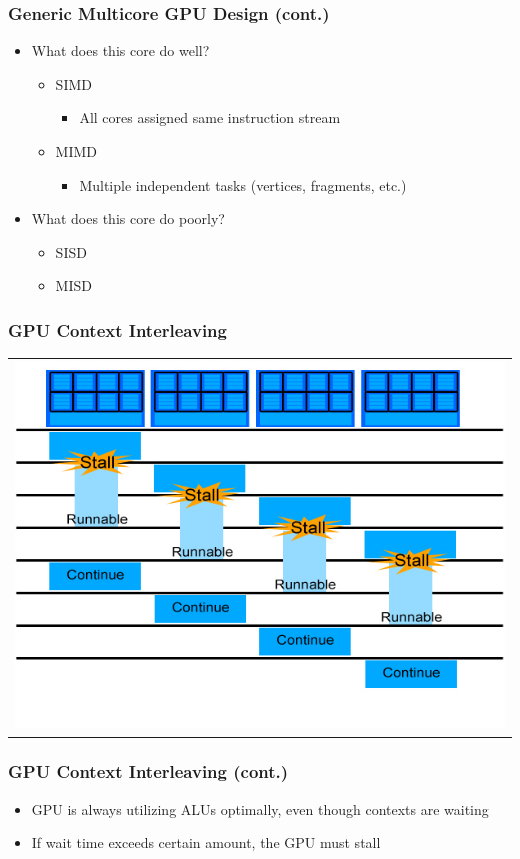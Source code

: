 \documentclass{beamer}
\begin{document}
\begin{frame}
	\frametitle{Generic Multicore GPU Design (cont.)}
	\begin{itemize}
		\item<1-> What does this core do well?
		\begin{itemize}
			\item<2-> SIMD
			\begin{itemize}
				\item<2-> All cores assigned same instruction stream
			\end{itemize}
			\item<3-> MIMD
			\begin{itemize}
				\item<3-> Multiple independent tasks (vertices, fragments, etc.)
			\end{itemize}
		\end{itemize}
		\item<4-> What does this core do poorly?
		\begin{itemize}
			\item<5-> SISD
			\item<5-> MISD
		\end{itemize}
	\end{itemize}
\end{frame}

\begin{frame}
	\frametitle{GPU Context Interleaving}
	\begin{tabular}{c}
		\includegraphics[width=.75\textwidth]{GPU-context-interleaving.jpg}
	\end{tabular}
\end{frame}

\begin{frame}
	\frametitle{GPU Context Interleaving (cont.)}
	\begin{itemize}
		\item<1-> GPU is always utilizing ALUs optimally, even though contexts are waiting
		\item<2-> If wait time exceeds certain amount, the GPU must stall
	\end{itemize}
\end{frame}
\end{document}
